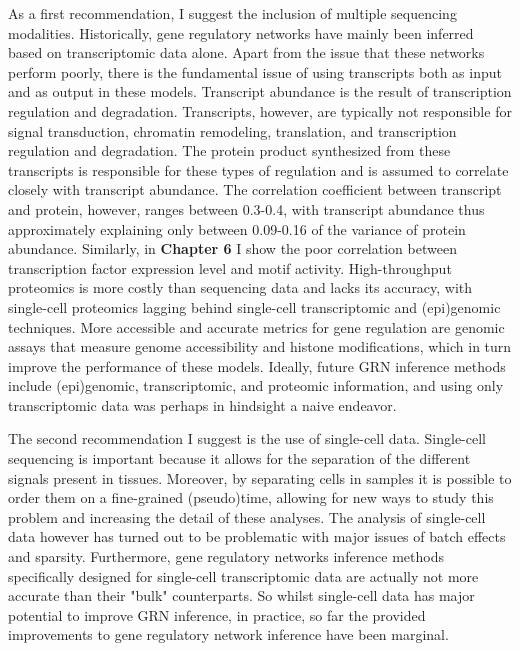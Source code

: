As a first recommendation, I suggest the inclusion of multiple sequencing modalities. Historically, gene regulatory networks have mainly been inferred based on transcriptomic data alone. Apart from the issue that these networks perform poorly\cite{McCalla_2021,Chen_2018,Pratapa_2020}, there is the fundamental issue of using transcripts both as input and as output in these models. Transcript abundance is the result of transcription regulation and degradation. Transcripts, however, are typically not responsible for signal transduction, chromatin remodeling, translation, and transcription regulation and degradation. The protein product synthesized from these transcripts is responsible for these types of regulation and is assumed to correlate closely with transcript abundance. The correlation coefficient between transcript and protein, however, ranges between 0.3-0.4\cite{Fortelny2017,Franks2017}, with transcript abundance thus approximately explaining only between 0.09-0.16 of the variance of protein abundance. Similarly, in \textbf{Chapter 6} I show the poor correlation between transcription factor expression level and motif activity. High-throughput proteomics is more costly than sequencing data and lacks its accuracy, with single-cell proteomics lagging behind single-cell transcriptomic and (epi)genomic techniques\cite{Bennett2023}. More accessible and accurate metrics for gene regulation are genomic assays that measure genome accessibility and histone modifications\cite{Xu_2020,Kamal_2021,Aibar_2017}, which in turn improve the performance of these models. Ideally, future GRN inference methods include (epi)genomic, transcriptomic, and proteomic information, and using only transcriptomic data was perhaps in hindsight a naive endeavor.

The second recommendation I suggest is the use of single-cell data. Single-cell sequencing is important because it allows for the separation of the different signals present in tissues. Moreover, by separating cells in samples it is possible to order them on a fine-grained (pseudo)time\cite{Saelens2019}, allowing for new ways to study this problem and increasing the detail of these analyses. The analysis of single-cell data however has turned out to be problematic with major issues of batch effects \cite{Tran2020,Haghverdi2018,Lhnemann2020} and sparsity\cite{Lhnemann2020,Bouland2023}. Furthermore, gene regulatory networks inference methods specifically designed for single-cell transcriptomic data are actually not more accurate than their "bulk" counterparts\cite{Chen_2018}. So whilst single-cell data has major potential to improve GRN inference, in practice, so far the provided improvements to gene regulatory network inference have been marginal. 


